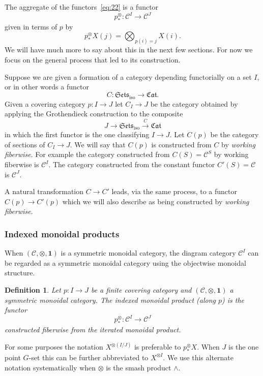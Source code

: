 \documentclass{amsart}
\newtheorem{definition}[equation]{Definition}
\newenvironment{defin}{\begin{definition}\rm}{\end{definition}}
\theoremstyle{definition}
\newtheorem{defin}[equation]{Definition}
\theoremstyle{remark}
\newcommand{\cat}[1]{{\mathcal #1}}
\newcommand{\categories}{\mathfrak{Cat}}
\newcommand{\isosets}{\mathfrak{Sets}_{\text{iso}}}
\newcommand{\one}{\mathbf{1}}
\newcommand{\tensorp}[1]{#1^{\otimes}_{\ast}}
\begin{document}
The aggregate of the functors~\eqref{eq:22} is a functor 
\[
\tensorp p:\cat C^{I}\to \cat C^{J}
\]
given in terms of $p$ by
\[
\tensorp pX(j)= \bigotimes_{p(i)=j} X(i).
\]
We will have much more to say about this in the next few sections.
For now we focus on the general process that led to its construction.

Suppose we are given a formation of a category depending functorially
on a set $I$, or in other words a functor
\[
C:\isosets\to \categories.
\]
Given a covering category $p:I\to J$  let $C_{I}\to J$ be the category
obtained by applying the Grothendieck construction to the composite 
\[
J\to \isosets\xrightarrow{C}{} \categories
\]
in which the first functor is the one classifying $I\to J$.  Let
$C(p)$ be the category of sections of $C_{I}\to J$.  We will say that
$C(p)$ is constructed from $C$ by {\em working fiberwise}.  For
example the category constructed from $C(S)=\cat C^{S}$ by working
fiberwise is $\cat C^{I}$.  The category constructed from the constant
functor $C'(S)=\cat C$ is $\cat C^{J}$.

A natural transformation $C\to C'$ leads, via the same process, to a
functor $C(p)\to C'(p)$ which we will also describe as being
constructed by {\em working fiberwise}.  




\subsubsection{Indexed monoidal products}
\label{sec:index-mono-prod-1}

When $(\cat C,\otimes,\one)$ is a symmetric monoidal category, the 
diagram category $\cat C^{I}$ can be regarded as a symmetric monoidal
category using the objectwise monoidal structure.

\begin{defin}
\label{def:38} Let $p:I\to J$ be a finite covering category and $(\cat
C,\otimes,\one)$ a symmetric monoidal category.  The {\em indexed
monoidal product} (along $p$) is the functor
\[
\tensorp p:\cat C^{I}\to \cat C^{J}
\]
constructed fiberwise from the iterated monoidal product.
\end{defin}

For some purposes the notation $X^{\otimes (I/J)}$ is preferable to
$p^{\otimes}_{\ast}X$.  When $J$ is the one point $G$-set this can be
further abbreviated to $X^{\otimes I}$.  We use this alternate
notation systematically when $\otimes$ is the smash product $\wedge$.
\end{document}
